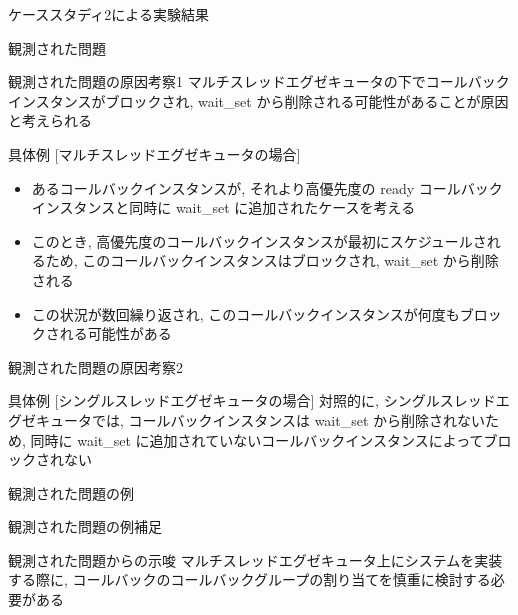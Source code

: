 \begin{frame}{ケーススタディ2による実験結果}
\end{frame}

\begin{frame}{観測された問題}
\end{frame}

\begin{frame}{観測された問題の原因考察1}
    マルチスレッドエグゼキュータの下でコールバックインスタンスがブロックされ, wait\_set から削除される可能性があることが原因と考えられる
    \vspace{-1mm}
    \begin{block}{具体例 [マルチスレッドエグゼキュータの場合]}
        \setlength{\linewidth}{0.98\columnwidth}
        \begin{itemize}
            \item あるコールバックインスタンスが, それより高優先度の ready コールバックインスタンスと同時に wait\_set に追加されたケースを考える
            \item このとき, 高優先度のコールバックインスタンスが最初にスケジュールされるため, このコールバックインスタンスはブロックされ, wait\_set から削除される
            \item この状況が数回繰り返され, このコールバックインスタンスが何度もブロックされる可能性がある
        \end{itemize}
    \end{block}
\end{frame}

\begin{frame}{観測された問題の原因考察2}
    \begin{block}{具体例 [シングルスレッドエグゼキュータの場合]}
        対照的に, シングルスレッドエグゼキュータでは, コールバックインスタンスは wait\_set から削除されないため, 同時に wait\_set に追加されていないコールバックインスタンスによってブロックされない
    \end{block}
\end{frame}

\begin{frame}{観測された問題の例}
\end{frame}

\begin{frame}{観測された問題の例補足}
\end{frame}

\begin{frame}{観測された問題からの示唆}
    マルチスレッドエグゼキュータ上にシステムを実装する際に, コールバックのコールバックグループの割り当てを慎重に検討する必要がある
\end{frame}
